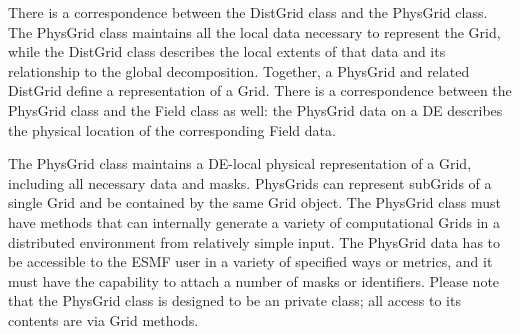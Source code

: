 There is a correspondence between the DistGrid class and the PhysGrid
class.  The PhysGrid class maintains all the local data necessary to
represent the Grid, while the DistGrid class describes the local extents
of that data and its relationship to the global decomposition.
Together, a PhysGrid and related DistGrid define a representation of
a Grid.  There is a correspondence between the PhysGrid class and the Field
class as well:  the PhysGrid data on a DE describes the physical location
of the corresponding Field data.

The PhysGrid class maintains a DE-local physical representation of a Grid,
including all necessary data and masks.  PhysGrids can represent subGrids
of a single Grid and be contained by the same Grid object. The PhysGrid
class must have methods that can internally generate a variety of
computational Grids in a distributed environment from relatively simple
input.  The PhysGrid data has to be accessible to the ESMF user in a
variety of specified ways or metrics, and it must have the capability to
attach a number of masks or identifiers.  Please note that the PhysGrid class
is designed to be an private class; all access to its contents are via
Grid methods.

